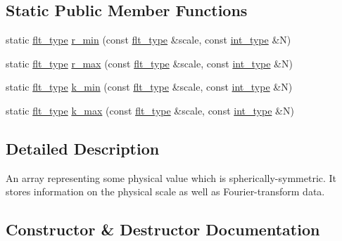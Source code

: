 \subsection*{Static Public Member Functions}
\begin{DoxyCompactItemize}
\item 
static \hyperlink{lib_2IceBRG__main_2common_8h_ad0f130a56eeb944d9ef2692ee881ecc4}{flt\+\_\+type} \hyperlink{classIceBRG_1_1Fourier_1_1radial__vector_aadf66af5a675d48151eb2ffd44e1b96e}{r\+\_\+min} (const \hyperlink{lib_2IceBRG__main_2common_8h_ad0f130a56eeb944d9ef2692ee881ecc4}{flt\+\_\+type} \&scale, const \hyperlink{lib_2IceBRG__main_2common_8h_ac4de9d9335536ac22821171deec8d39e}{int\+\_\+type} \&N)
\item 
static \hyperlink{lib_2IceBRG__main_2common_8h_ad0f130a56eeb944d9ef2692ee881ecc4}{flt\+\_\+type} \hyperlink{classIceBRG_1_1Fourier_1_1radial__vector_a5251fa581f691f6b138fd7dda2a74a4f}{r\+\_\+max} (const \hyperlink{lib_2IceBRG__main_2common_8h_ad0f130a56eeb944d9ef2692ee881ecc4}{flt\+\_\+type} \&scale, const \hyperlink{lib_2IceBRG__main_2common_8h_ac4de9d9335536ac22821171deec8d39e}{int\+\_\+type} \&N)
\item 
static \hyperlink{lib_2IceBRG__main_2common_8h_ad0f130a56eeb944d9ef2692ee881ecc4}{flt\+\_\+type} \hyperlink{classIceBRG_1_1Fourier_1_1radial__vector_a4e6c0612d98320a95470dcc68553ac61}{k\+\_\+min} (const \hyperlink{lib_2IceBRG__main_2common_8h_ad0f130a56eeb944d9ef2692ee881ecc4}{flt\+\_\+type} \&scale, const \hyperlink{lib_2IceBRG__main_2common_8h_ac4de9d9335536ac22821171deec8d39e}{int\+\_\+type} \&N)
\item 
static \hyperlink{lib_2IceBRG__main_2common_8h_ad0f130a56eeb944d9ef2692ee881ecc4}{flt\+\_\+type} \hyperlink{classIceBRG_1_1Fourier_1_1radial__vector_a252f5b44f86317b2b17fc47e4e16a72a}{k\+\_\+max} (const \hyperlink{lib_2IceBRG__main_2common_8h_ad0f130a56eeb944d9ef2692ee881ecc4}{flt\+\_\+type} \&scale, const \hyperlink{lib_2IceBRG__main_2common_8h_ac4de9d9335536ac22821171deec8d39e}{int\+\_\+type} \&N)
\end{DoxyCompactItemize}


\subsection{Detailed Description}
An array representing some physical value which is spherically-\/symmetric. It stores information on the physical scale as well as Fourier-\/transform data. 

\subsection{Constructor \& Destructor Documentation}
\hypertarget{classIceBRG_1_1Fourier_1_1radial__vector_a4bd62a63fe41112d7f624f420ac42d9f}{}
